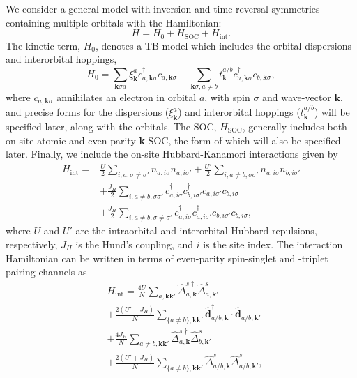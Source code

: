 \documentclass[%
reprint,
superscriptaddress,
 amsmath,amssymb,
 aps,
prb,
nobalancelastpage,
]{revtex4-2}
\begin{document}
We consider a general model with inversion and time-reversal symmetries containing multiple orbitals with the Hamiltonian:
\begin{equation}
    H = H_{0} + H_{\text{SOC}} + H_{\text{int}}.
\end{equation}
The kinetic term, $H_{0}$, denotes a TB model which includes the orbital dispersions and interorbital hoppings,
\begin{equation}
\label{TBgeneral}
    H_{0} = \sum_{\textbf{k}\sigma a} \xi^{a}_{\textbf{k}}c_{a,\textbf{k}\sigma}^{\dagger}c_{a,\textbf{k}\sigma} + \sum_{\textbf{k}\sigma, a\neq b} t_{\textbf{k}}^{a/b}c_{a,\textbf{k}\sigma}^{\dagger}c_{b,\textbf{k}\sigma},
\end{equation}
where $c_{a,\textbf{k}\sigma}$ annihilates an electron in orbital $a$, with spin $\sigma$ and wave-vector $\textbf{k}$, and precise forms for the dispersions ($\xi_{\textbf{k}}^{a}$) and interorbital hoppings ($t_{\textbf{k}}^{a/b}$) will be specified later, along with the orbitals. The SOC, $H_{\text{SOC}}$, generally includes both on-site atomic and even-parity \textbf{k}-SOC, the form of which will also be specified later. Finally, we include the on-site Hubbard-Kanamori interactions given by
\begin{equation}
\begin{aligned}
H_{\text{int}} = &\frac{U}{2}\sum_{i,a,\sigma\neq\sigma'}n_{a,i\sigma}n_{a,i\sigma'} + \frac{U'}{2}\sum_{i,a\neq b,\sigma\sigma'}n_{a,i\sigma}n_{b,i\sigma'}\\& + \frac{J_{H}}{2}\sum_{i, a\neq b,\sigma\sigma'}c^{\dagger}_{a,i\sigma}c^{\dagger}_{b,i\sigma'}c_{a,i\sigma'}c_{b,i\sigma} \\&+\frac{J_{H}}{2}\sum_{i, a\neq b,\sigma\neq\sigma'}c^{\dagger}_{a,i\sigma}c^{\dagger}_{a,i\sigma'}c_{b,i\sigma'}c_{b,i\sigma},
\end{aligned}
\end{equation}
where $U$ and $U'$ are the intraorbital and interorbital Hubbard repulsions, respectively, $J_{H}$ is the Hund's coupling, and $i$ is the site index. The interaction Hamiltonian can be written in terms of even-parity spin-singlet and -triplet pairing channels \cite{Puetter2012EPL,vafek2017hund,Suh2019,lindquist2019distinct,clepkens2021} as
\begin{equation} \label{interactions}
\begin{aligned}
&H_{\text{int}} = \frac{4U}{N}\sum_{a,\textbf{k}\textbf{k}'}\hat{\Delta}^{s\dagger}_{a,\textbf{k}}\hat{\Delta}^{s}_{a,\textbf{k}'} \\&+ \frac{2(U'-J_{H})}{N}\sum_{\{a\neq b\},\textbf{k}\textbf{k}'}\hat{\mathbf{d}}_{a/b,\textbf{k}}^{\dagger}\cdot\hat{\mathbf{d}}_{a/b,\textbf{k}'} \\&+\frac{4J_{H}}{N}\sum_{a\neq b,\textbf{k}\textbf{k}'}\hat{\Delta}^{s\dagger}_{a,\textbf{k}}\hat{\Delta}^{s}_{b,\textbf{k}'}\\&+ \frac{2(U'+J_{H})}{N}\sum_{\{a\neq b\},\textbf{k}\textbf{k}'}\hat{\Delta}^{s\dagger}_{a/b,\textbf{k}}\hat{\Delta}^{s}_{a/b,\textbf{k}'},
\end{aligned}
\end{equation}
\end{document}
